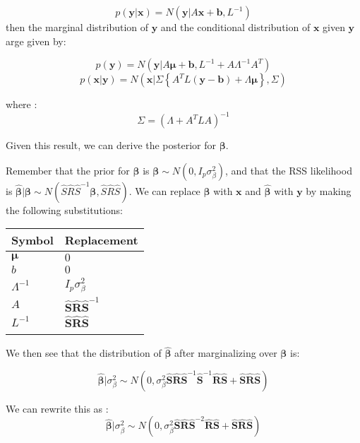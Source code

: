 {$$p(\textbf{y}|\textbf{x}) = N(\textbf{y}|A\textbf{x}+\textbf{b},L^{-1})$$
then the marginal distribution of \(\textbf{y}\) and the conditional distribution of \(\textbf{x}\) given \(\textbf{y}\) arge given by: 

$$ p(\textbf{y}) = N(\textbf{y}|A\boldsymbol{\mu}+\textbf{b},L^{-1}+A\Lambda^{-1}A^{T})$$
$$p(\textbf{x}|\textbf{y}) = N(\textbf{x}| \Sigma \left\{ A^{T} L ( \textbf{y} - \textbf{b} ) + \Lambda \boldsymbol{\mu} \right\} , \Sigma)$$

where :
$$\Sigma = (\Lambda + A^{T}LA)^{-1}$$

Given this result, we can derive the posterior for \(\boldsymbol{\beta}\).

Remember that the prior for \(\boldsymbol{\beta}\) is \(\boldsymbol{\beta} \sim N(0,I_p\sigma^2_\beta)\), and that the RSS likelihood is \(\hat{\boldsymbol{\beta}} | \boldsymbol{\beta} \sim N(\hat{S}\hat{R}\hat{S}^{-1}\boldsymbol{\beta},\hat{S}\hat{R}\hat{S})\).  
We can replace \(\boldsymbol{\beta}\) with \(\textbf{x}\) and \(\hat{\boldsymbol{\beta}}\) with \(\textbf{y}\) by making the following substitutions:

\begin{center}
\begin{tabular}{ll}
Symbol & Replacement\\
\hline
\(\boldsymbol{\mu}\) & \(0\)\\
\(b\) & \(0\)\\
\(\Lambda^{-1}\) & \(I_p \sigma^2_\beta\)\\
\(A\) & \(\hat{\textbf{S}}\hat{\textbf{R}}\hat{\textbf{S}}^{-1}\)\\
\(L^{-1}\) & \(\hat{\textbf{S}}\hat{\textbf{R}}\hat{\textbf{S}}\)\\
 & \\
\end{tabular}
\end{center}

We then see that the distribution of \(\hat{\boldsymbol{\beta}}\) after marginalizing over $\boldsymbol{\beta}$ is:

$$ \hat{\boldsymbol{\beta}}|\sigma_\beta^2 \sim N(0,\sigma_\beta^2\hat{\textbf{S}}\hat{\textbf{R}}\hat{\textbf{S}}^{-1}\hat{\textbf{S}}^{-1}\hat{\textbf{R}}\hat{\textbf{S}}+\hat{\textbf{S}}\hat{\textbf{R}}\hat{\textbf{S}})$$ 

We can rewrite this as :
$$\hat{\boldsymbol{\beta}}|\sigma_\beta^2 \sim  N(0,\sigma_\beta^2\hat{\textbf{S}}\hat{\textbf{R}}\hat{\textbf{S}}^{-2}\hat{\textbf{R}}\hat{\textbf{S}}+\hat{\textbf{S}}\hat{\textbf{R}}\hat{\textbf{S}}) $$

}
